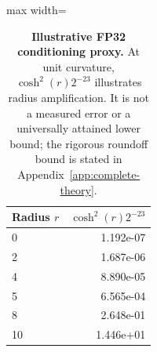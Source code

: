 \begin{table}[t]
\centering
\caption{\textbf{Illustrative FP32 conditioning proxy.} At unit curvature, $\cosh^2(r)2^{-23}$ illustrates radius amplification. It is not a measured error or a universally attained lower bound; the rigorous roundoff bound is stated in Appendix~\ref{app:complete-theory}.}
\label{tab:conditioning}
\footnotesize\setlength{\tabcolsep}{4.2pt}\renewcommand{\arraystretch}{1.12}
\begin{adjustbox}{max width=\linewidth}
\begin{tabular}{lr}
\toprule
Radius $r$ & $\cosh^2(r)2^{-23}$ \\
\midrule
0 & 1.192e-07 \\
2 & 1.687e-06 \\
4 & 8.890e-05 \\
5 & 6.565e-04 \\
8 & 2.648e-01 \\
10 & 1.446e+01 \\
\bottomrule
\end{tabular}
\end{adjustbox}
\end{table}
